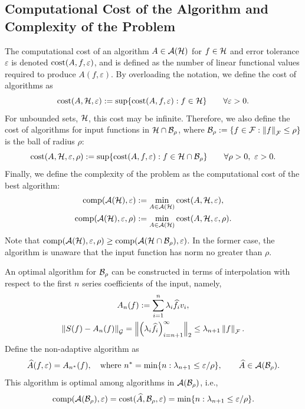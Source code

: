 \documentclass[graybox,footinfo]{svmult}
\newcommand{\DHJRnorm}[2][{}]{\ensuremath{\left \lVert #2 \right \rVert}_{#1}}
\newcommand{\DHJRBignorm}[2][{}]{\ensuremath{\Bigl \lVert #2 \Bigr \rVert}_{#1}}
\begin{document}
\subsection{Computational Cost of the Algorithm and Complexity of the Problem} The computational cost of an algorithm $A \in {\mathcal{A}}({\mathcal{H}})$ for $f \in {\mathcal{H}}$ and error tolerance $\varepsilon$ is denoted $\textup{cost}(A,f,\varepsilon)$, and is defined as the number of linear functional values required to produce $A(f,\varepsilon)$.  By overloading the notation, we define the cost of algorithms as 
\begin{equation*}
\textup{cost}(A,{\mathcal{H}},\varepsilon) : = \sup \{\textup{cost}(A,f,\varepsilon) : f \in {\mathcal{H}} \} \qquad \forall \varepsilon > 0.
\end{equation*}
For unbounded sets, ${\mathcal{H}}$, this cost may be infinite.  Therefore, we also define the cost of algorithms for input functions in ${\mathcal{H}} \cap {\mathcal{B}}_{\rho}$, where $\calB_{\rho} : = \{ f \in \calF : \DHJRnorm[\calF]{f} \le \rho \}$ is the ball of radius $\rho$:
\begin{equation*}
\textup{cost}(A,{\mathcal{H}},\varepsilon,\rho) : = \sup \{\textup{cost}(A,f,\varepsilon) : f \in {\mathcal{H}} \cap {\mathcal{B}}_{\rho} \} \qquad \forall \rho > 0, \ \varepsilon > 0.
\end{equation*}
Finally, we define the complexity of the problem as the computational cost of the best algorithm:
\begin{gather*}
\textup{comp}({\mathcal{A}}({\mathcal{H}}),\varepsilon) := \min_{A \in {\mathcal{A}}({\mathcal{H}})} \textup{cost}(A, {\mathcal{H}}, \varepsilon), \\
\textup{comp}({\mathcal{A}}({\mathcal{H}}),\varepsilon,\rho) := \min_{A \in {\mathcal{A}}({\mathcal{H}})} \textup{cost}(A, {\mathcal{H}}, \varepsilon, \rho).
\end{gather*}
Note that $\textup{comp}({\mathcal{A}}({\mathcal{H}}),\varepsilon,\rho) \ge \textup{comp}({\mathcal{A}}({\mathcal{H}} \cap {\mathcal{B}}_{\rho}),\varepsilon)$.  In the former case, the algorithm is unaware  that the input function has norm no greater than $\rho$.  

An optimal algorithm for ${\mathcal{B}}_{\rho}$ can be constructed in terms of interpolation with respect to the first $n$ series coefficients of the input, namely,
\begin{gather}  \label{optAdef}
A_n(f) := \sum_{i=1}^n \lambda_{i} \widehat{f}_{i} v_{i}, \\
\label{errOpt}
\DHJRnorm[\calG]{S(f) - A_n(f)} = \DHJRBignorm[2]{\left(\lambda_{i} \widehat{f}_{i} \right)_{i= n+1}^{\infty}} \le \lambda_{n+1} \DHJRnorm[\calF]{f}.
\end{gather}
Define the non-adaptive algorithm as
\begin{equation} \label{optBallalg}
\widehat{A}(f,\varepsilon) = A_{n^*}(f), \quad \text{where } n^* = \min\{ n : \lambda_{n+1} \le \varepsilon/\rho \}, \qquad \widehat{A} \in \calA(\calB_{\rho}).
\end{equation}
This algorithm is optimal among algorithms in ${\mathcal{A}}({\mathcal{B}}_{\rho})$, i.e.,
\[
\textup{comp}({\mathcal{A}}({\mathcal{B}}_{\rho}),\varepsilon) = \textup{cost}(\widehat{A},{\mathcal{B}}_{\rho},\varepsilon) =
\min\{ n : \lambda_{n+1} \le \varepsilon/\rho \}.
\]
\end{document}
